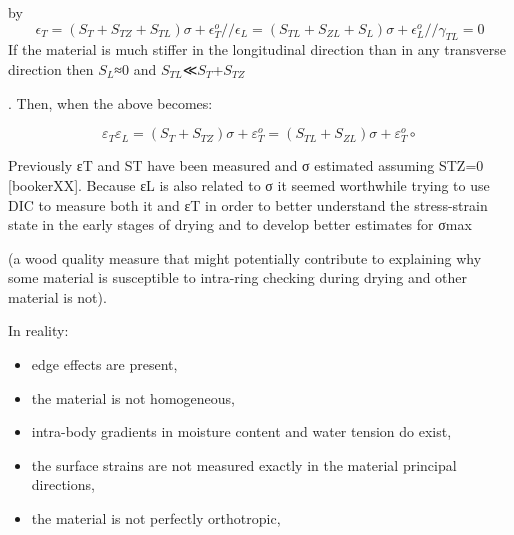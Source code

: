 by
\begin {equation}
\epsilon_T=(S_T+S_{TZ}+S_{TL})σ+\epsilon^o_T//
\epsilon_L=(S_{TL}+S_{ZL}+S_L)σ+\epsilon^o_L//
\gamma_{TL}=0
\end{equation}
If the material is much stiffer in the longitudinal direction than in any transverse direction then $S_L$≈0
and $S_{TL}$≪$S_T$+$S_{TZ}$

. Then, when the above becomes:

$$\varepsilon_T \varepsilon_L = (S_T+S_{TZ})\sigma + \varepsilon^o_T = \left(S_{TL}+S_{ZL}\right) \sigma + \varepsilon^o_T∘$$

Previously εT
and ST have been measured and σ estimated assuming STZ=0 [bookerXX]. Because εL is also related to σ it seemed worthwhile trying to use DIC to measure both it and εT in order to better understand the stress-strain state in the early stages of drying and to develop better estimates for σmax

(a wood quality measure that might potentially contribute to explaining why some material is susceptible to intra-ring checking during drying and other material is not).

In reality:

   \begin{itemize}
\item  edge effects are present,
\end{itemize}
\begin{itemize}
\item     the material is not homogeneous,
\end{itemize}
\begin{itemize}
\item     intra-body gradients in moisture content and water tension do exist,
\end{itemize}
\begin{itemize}
\item     the surface strains are not measured exactly in the material principal directions,
\end{itemize}
\begin{itemize}
\item     the material is not perfectly orthotropic,
\end{itemize}